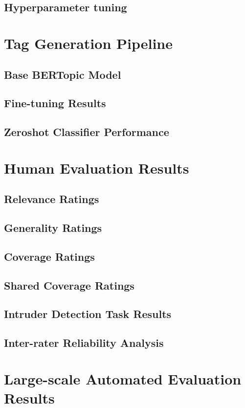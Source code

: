 \subsection{Hyperparameter tuning}

\section{Tag Generation Pipeline}
\subsection{Base BERTopic Model}
\subsection{Fine-tuning Results}
\subsection{Zeroshot Classifier Performance}


\section{Human Evaluation Results}
\subsection{Relevance Ratings}
\subsection{Generality Ratings}
\subsection{Coverage Ratings}
\subsection{Shared Coverage Ratings}
\subsection{Intruder Detection Task Results}
\subsection{Inter-rater Reliability Analysis}

\section{Large-scale Automated Evaluation Results}
